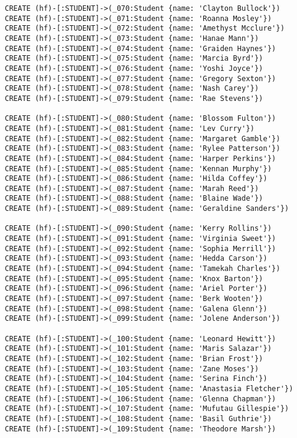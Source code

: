 \begin{lstlisting}
CREATE (hf)-[:STUDENT]->(_070:Student {name: 'Clayton Bullock'})
CREATE (hf)-[:STUDENT]->(_071:Student {name: 'Roanna Mosley'})
CREATE (hf)-[:STUDENT]->(_072:Student {name: 'Amethyst Mcclure'})
CREATE (hf)-[:STUDENT]->(_073:Student {name: 'Hanae Mann'})
CREATE (hf)-[:STUDENT]->(_074:Student {name: 'Graiden Haynes'})
CREATE (hf)-[:STUDENT]->(_075:Student {name: 'Marcia Byrd'})
CREATE (hf)-[:STUDENT]->(_076:Student {name: 'Yoshi Joyce'})
CREATE (hf)-[:STUDENT]->(_077:Student {name: 'Gregory Sexton'})
CREATE (hf)-[:STUDENT]->(_078:Student {name: 'Nash Carey'})
CREATE (hf)-[:STUDENT]->(_079:Student {name: 'Rae Stevens'})

CREATE (hf)-[:STUDENT]->(_080:Student {name: 'Blossom Fulton'})
CREATE (hf)-[:STUDENT]->(_081:Student {name: 'Lev Curry'})
CREATE (hf)-[:STUDENT]->(_082:Student {name: 'Margaret Gamble'})
CREATE (hf)-[:STUDENT]->(_083:Student {name: 'Rylee Patterson'})
CREATE (hf)-[:STUDENT]->(_084:Student {name: 'Harper Perkins'})
CREATE (hf)-[:STUDENT]->(_085:Student {name: 'Kennan Murphy'})
CREATE (hf)-[:STUDENT]->(_086:Student {name: 'Hilda Coffey'})
CREATE (hf)-[:STUDENT]->(_087:Student {name: 'Marah Reed'})
CREATE (hf)-[:STUDENT]->(_088:Student {name: 'Blaine Wade'})
CREATE (hf)-[:STUDENT]->(_089:Student {name: 'Geraldine Sanders'})

CREATE (hf)-[:STUDENT]->(_090:Student {name: 'Kerry Rollins'})
CREATE (hf)-[:STUDENT]->(_091:Student {name: 'Virginia Sweet'})
CREATE (hf)-[:STUDENT]->(_092:Student {name: 'Sophia Merrill'})
CREATE (hf)-[:STUDENT]->(_093:Student {name: 'Hedda Carson'})
CREATE (hf)-[:STUDENT]->(_094:Student {name: 'Tamekah Charles'})
CREATE (hf)-[:STUDENT]->(_095:Student {name: 'Knox Barton'})
CREATE (hf)-[:STUDENT]->(_096:Student {name: 'Ariel Porter'})
CREATE (hf)-[:STUDENT]->(_097:Student {name: 'Berk Wooten'})
CREATE (hf)-[:STUDENT]->(_098:Student {name: 'Galena Glenn'})
CREATE (hf)-[:STUDENT]->(_099:Student {name: 'Jolene Anderson'})

CREATE (hf)-[:STUDENT]->(_100:Student {name: 'Leonard Hewitt'})
CREATE (hf)-[:STUDENT]->(_101:Student {name: 'Maris Salazar'})
CREATE (hf)-[:STUDENT]->(_102:Student {name: 'Brian Frost'})
CREATE (hf)-[:STUDENT]->(_103:Student {name: 'Zane Moses'})
CREATE (hf)-[:STUDENT]->(_104:Student {name: 'Serina Finch'})
CREATE (hf)-[:STUDENT]->(_105:Student {name: 'Anastasia Fletcher'})
CREATE (hf)-[:STUDENT]->(_106:Student {name: 'Glenna Chapman'})
CREATE (hf)-[:STUDENT]->(_107:Student {name: 'Mufutau Gillespie'})
CREATE (hf)-[:STUDENT]->(_108:Student {name: 'Basil Guthrie'})
CREATE (hf)-[:STUDENT]->(_109:Student {name: 'Theodore Marsh'})


\end{lstlisting}
